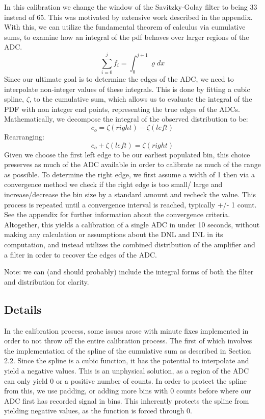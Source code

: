 \documentclass[11pt, letterpaper]{article}
\begin{document}
In this calibration we change the window of the Savitzky-Golay filter to being 33 instead of 65. 
This was motivated by extensive work described in the appendix. 
With this, we can utilize the fundamental theorem of calculus via cumulative sums, to examine how an integral of the pdf behaves over larger regions of the ADC. 
\[ \sum_{i=0}^{j} f_i= \int_{0}^{j+1} \varrho dx \]
Since our ultimate goal is to determine the edges of the ADC, we need to interpolate non-integer values of these integrals. 
This is done by fitting a cubic spline, $ \zeta$, to the cumulative sum, which allows us to evaluate the integral of the PDF with non integer end points, representing the true edges of the ADCs. 
Mathematically, we decompose the integral of the observed distribution to be:
\[c_o = \zeta(right) - \zeta(left) \]
Rearranging: 
\[c_o + \zeta(left) = \zeta(right) \]
Given we choose the first left edge to be our earliest populated bin, this choice preserves as much of the ADC available in order to calibrate as much of the range as possible. 
To determine the right edge, we first assume a width of 1 then via a convergence method we check if the right edge is too small/ large and increase/decrease the bin size by a standard amount and recheck the value. 
This process is repeated until a convergence interval is reached, typically +/- 1 count. 
See the appendix for further information about the convergence criteria. 
Altogether, this yields a calibration of a single ADC in under 10 seconds, without making any calculation or assumptions about the DNL and INL in its computation, and instead utilizes the combined distribution of the amplifier and a filter in order to recover the edges of the ADC.  

Note: we can (and should probably) include the integral forms of both the filter and distribution for clarity. 

\subsection{Details} 
\indent 


In the calibration process, some issues arose with minute fixes implemented in order to not throw off the entire calibration process. 
The first of which involves the implementation of the spline of the cumulative sum as described in Section 2.2. 
Since the spline is a cubic function, it has the potential to interpolate and yield a negative values. 
This is an unphysical solution, as a region of the ADC can only yield 0 or a positive number of counts. 
In order to protect the spline from this, we use padding, or adding more bins with 0 counts before where our ADC first has recorded signal in bins. 
This inherently protects the spline from yielding negative values, as the function is forced through 0. 
\indent 
\end{document}
